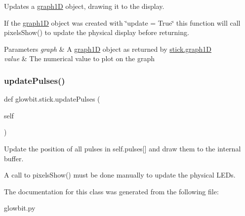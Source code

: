 Updates a \hyperlink{classglowbit_1_1stick_1_1graph1D}{graph1D} object, drawing it to the display. 

If the \hyperlink{classglowbit_1_1stick_1_1graph1D}{graph1D} object was created with \char`\"{}update = True\char`\"{} this function will call pixels\+Show() to update the physical display before returning.


\begin{DoxyParams}{Parameters}
{\em graph} & A \hyperlink{classglowbit_1_1stick_1_1graph1D}{graph1D} object as returned by \hyperlink{classglowbit_1_1stick_1_1graph1D}{stick.\+graph1D} \\
\hline
{\em value} & The numerical value to plot on the graph \\
\hline
\end{DoxyParams}
\mbox{\label{classglowbit_1_1stick_a84e72d81b9c96b1acb268b730866a8ea}} 
\subsubsection{\texorpdfstring{update\+Pulses()}{updatePulses()}}
{\footnotesize\ttfamily def glowbit.\+stick.\+update\+Pulses (\begin{DoxyParamCaption}\item[{}]{self }\end{DoxyParamCaption})}



Update the position of all pulses in self.\+pulses\mbox{[}\mbox{]} and draw them to the internal buffer. 

A call to pixels\+Show() must be done manually to update the physical L\+E\+Ds. 

The documentation for this class was generated from the following file\+:\begin{DoxyCompactItemize}
\item 
glowbit.\+py\end{DoxyCompactItemize}
